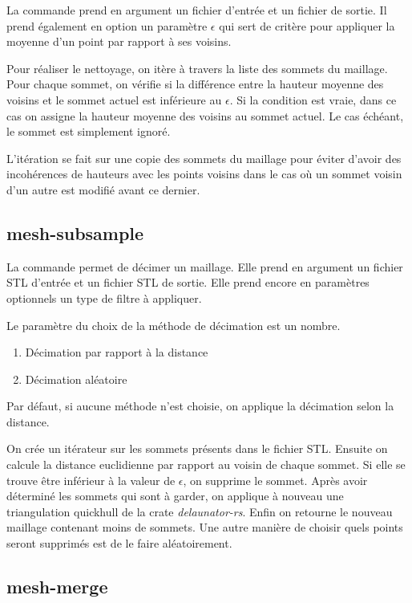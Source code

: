 La commande prend en argument un fichier d'entrée et un fichier de sortie. Il
prend également en option un paramètre $\epsilon$ qui sert de critère pour
appliquer la moyenne d'un point par rapport à ses voisins.

Pour réaliser le nettoyage, on itère à travers la liste des sommets du maillage.
Pour chaque sommet, on vérifie si la différence entre la hauteur moyenne des voisins
et le sommet actuel est inférieure au $\epsilon$.
Si la condition est vraie, dans ce cas on assigne la hauteur moyenne des voisins
au sommet actuel. Le cas échéant, le sommet est simplement ignoré.

L'itération se fait sur une copie des sommets du maillage pour éviter d'avoir
des incohérences de hauteurs avec les points voisins dans le cas où un sommet
voisin d'un autre est modifié avant ce dernier.

\subsection{mesh-subsample}

La commande permet de décimer un maillage. Elle
prend en argument un fichier STL d'entrée et un fichier STL de sortie.
Elle prend encore en paramètres optionnels un type de filtre à appliquer.

Le paramètre du choix de la méthode de décimation est un nombre.

\begin{enumerate}
	\item Décimation par rapport à la distance
	\item Décimation aléatoire
\end{enumerate}

Par défaut, si aucune méthode n'est choisie, on applique la décimation selon la
distance.

On crée un itérateur sur les sommets présents dans le fichier STL. Ensuite on
calcule la distance euclidienne par rapport au voisin de chaque sommet.
Si elle se trouve être inférieur à la valeur de $\epsilon$, on supprime le
sommet. Après avoir déterminé les sommets qui sont à garder, on applique à
nouveau une triangulation quickhull de la crate \textit{delaunator-rs}. Enfin on
retourne le nouveau maillage contenant moins de sommets. 
Une autre manière de
choisir quels points seront supprimés est de le faire aléatoirement.

\subsection{mesh-merge}

